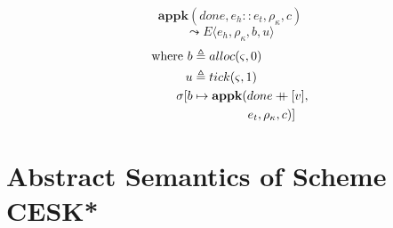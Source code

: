 \documentclass[12pt,draft]{article}
\newcommand\mdoubleplus{\ensuremath{\mathbin{+\mkern-9mu+}}}
\begin{document}
\begin{multicols*}{2}
\[
\textbf{appk}(done, e_h::e_t, \rho_{\kappa}, c)
\]
\vspace{-7mm}
\[
\leadsto
E\langle
e_h , \rho_{\kappa} , b , u
\rangle
\]
\vspace{-10mm}
\begin{align*}
\text{where } b &\triangleq alloc(\varsigma, 0) \\
u &\triangleq tick(\varsigma, 1) \\
\sigma[b &\mapsto \textbf{appk}(done \mdoubleplus [v], \\
&\;\;\;\;\;\;\;\;\;\;\;\;\;\;\;\; e_t , \rho_{\kappa} , c)]
\end{align*}
\end{multicols*}



\newpage
\section{Abstract Semantics of Scheme CESK*}
\end{document}
